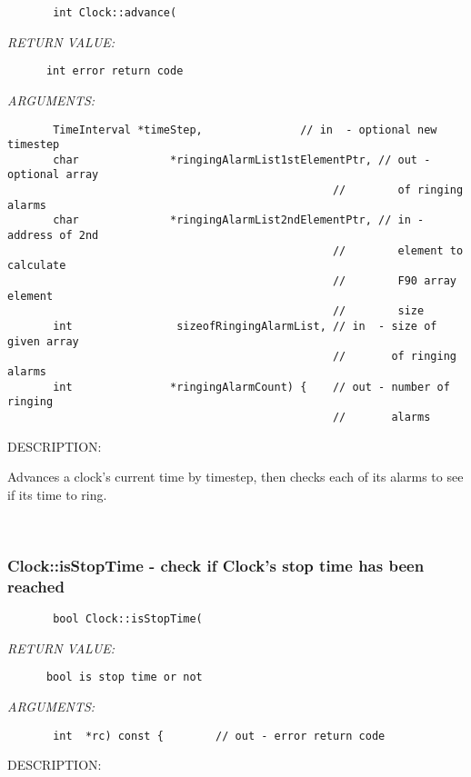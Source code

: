   
\begin{verbatim}       int Clock::advance(\end{verbatim}{\em RETURN VALUE:}
\begin{verbatim}      int error return code\end{verbatim}{\em ARGUMENTS:}
\begin{verbatim}       TimeInterval *timeStep,               // in  - optional new timestep
       char              *ringingAlarmList1stElementPtr, // out - optional array
                                                  //        of ringing alarms
       char              *ringingAlarmList2ndElementPtr, // in - address of 2nd
                                                  //        element to calculate
                                                  //        F90 array element
                                                  //        size
       int                sizeofRingingAlarmList, // in  - size of given array
                                                  //       of ringing alarms
       int               *ringingAlarmCount) {    // out - number of ringing
                                                  //       alarms\end{verbatim}
{\sf DESCRIPTION:\\ }


       Advances a clock's current time by timestep, then checks
       each of its alarms to see if its time to ring.
   
 
\mbox{}\hrulefill\ 
 
\subsubsection [Clock::isStopTime] {Clock::isStopTime - check if Clock's stop time has been reached}


  
\begin{verbatim}       bool Clock::isStopTime(\end{verbatim}{\em RETURN VALUE:}
\begin{verbatim}      bool is stop time or not\end{verbatim}{\em ARGUMENTS:}
\begin{verbatim}       int  *rc) const {        // out - error return code\end{verbatim}
{\sf DESCRIPTION:\\ }


